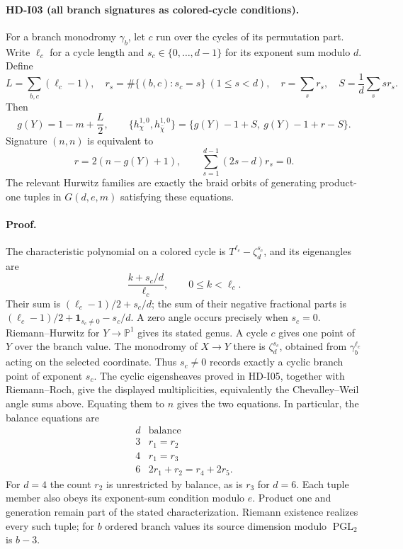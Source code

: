\paragraph{HD-I03 (all branch signatures as colored-cycle conditions).}
For a branch monodromy $\gamma_b$, let $c$ run over the cycles of its
permutation part. Write $\ell_c$ for a cycle length and
$s_c\in\{0,\ldots,d-1\}$ for its exponent sum modulo $d$. Define
\[
L=\sum_{b,c}(\ell_c-1),\quad
r_s=\#\{(b,c):s_c=s\}\ (1\le s<d),\quad
r=\sum_s r_s,\quad S=\frac1d\sum_s sr_s.
\]
Then
\[
g(Y)=1-m+\frac L2,
\qquad
\{h^{1,0}_\chi,h^{1,0}_{\bar\chi}\}
=\{g(Y)-1+S,\ g(Y)-1+r-S\}.
\]
Signature $(n,n)$ is equivalent to
\[
r=2(n-g(Y)+1),\qquad
\sum_{s=1}^{d-1}(2s-d)r_s=0.
\]
The relevant Hurwitz families are exactly the braid orbits of generating
product-one tuples in $G(d,e,m)$ satisfying these equations.

\paragraph{Proof.}
The characteristic polynomial on a colored cycle is
$T^{\ell_c}-\zeta_d^{s_c}$, and its eigenangles are
\[
\frac{k+s_c/d}{\ell_c},\qquad 0\le k<\ell_c.
\]
Their sum is $(\ell_c-1)/2+s_c/d$; the sum of their negative fractional
parts is $(\ell_c-1)/2+\mathbf1_{s_c\ne0}-s_c/d$. A zero angle
occurs precisely when $s_c=0$.
Riemann--Hurwitz for $Y\to\mathbb P^1$ gives its stated genus. A cycle
$c$ gives one point of $Y$ over the branch value. The monodromy of
$X\to Y$ there is $\zeta_d^{s_c}$, obtained from
$\gamma_b^{\ell_c}$ acting on the selected coordinate. Thus $s_c\ne0$
records exactly a cyclic branch point of exponent $s_c$.
The cyclic eigensheaves proved in HD-I05, together with Riemann--Roch,
give the displayed multiplicities, equivalently the Chevalley--Weil
angle sums above. Equating them to $n$ gives the two equations.
In particular, the balance equations are
\[
\begin{array}{c|l}
d&\text{balance}\\\hline
3&r_1=r_2\\
4&r_1=r_3\\
6&2r_1+r_2=r_4+2r_5.
\end{array}
\]
For $d=4$ the count $r_2$ is unrestricted by balance, as is $r_3$ for
$d=6$. Each tuple member also obeys its exponent-sum condition modulo
$e$. Product one and generation remain part of the stated
characterization. Riemann existence realizes every such tuple; for
$b$ ordered branch values its source dimension modulo
$\operatorname{PGL}_2$ is $b-3$.

